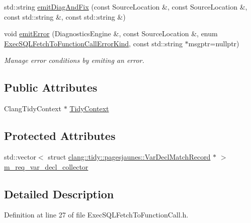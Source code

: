 \begin{DoxyCompactItemize}
std\+::string \hyperlink{classclang_1_1tidy_1_1pagesjaunes_1_1_exec_s_q_l_fetch_to_function_call_a4c78d8c38616b4f3cf6f4294f2a22953}{emit\+Diag\+And\+Fix} (const Source\+Location \&, const Source\+Location \&, const std\+::string \&, const std\+::string \&)
\item 
void \hyperlink{classclang_1_1tidy_1_1pagesjaunes_1_1_exec_s_q_l_fetch_to_function_call_a28043b514dd024dde394972563d78800}{emit\+Error} (Diagnostics\+Engine \&, const Source\+Location \&, enum \hyperlink{classclang_1_1tidy_1_1pagesjaunes_1_1_exec_s_q_l_fetch_to_function_call_aa05c362f1878d66a9239f3e154288081}{Exec\+S\+Q\+L\+Fetch\+To\+Function\+Call\+Error\+Kind}, const std\+::string $\ast$msgptr=nullptr)
\begin{DoxyCompactList}\small\item\em Manage error conditions by emiting an error. \end{DoxyCompactList}\end{DoxyCompactItemize}
\subsection*{Public Attributes}
\begin{DoxyCompactItemize}
\item 
Clang\+Tidy\+Context $\ast$ \hyperlink{classclang_1_1tidy_1_1pagesjaunes_1_1_exec_s_q_l_fetch_to_function_call_adaa3d15f432824085c1091d31c11fdf4}{Tidy\+Context}
\end{DoxyCompactItemize}
\subsection*{Protected Attributes}
\begin{DoxyCompactItemize}
\item 
std\+::vector$<$ struct \hyperlink{structclang_1_1tidy_1_1pagesjaunes_1_1_var_decl_match_record}{clang\+::tidy\+::pagesjaunes\+::\+Var\+Decl\+Match\+Record} $\ast$ $>$ \hyperlink{classclang_1_1tidy_1_1pagesjaunes_1_1_exec_s_q_l_fetch_to_function_call_abe52e863518a69f5d364a9daf9c0099d}{m\+\_\+req\+\_\+var\+\_\+decl\+\_\+collector}
\end{DoxyCompactItemize}


\subsection{Detailed Description}


Definition at line 27 of file Exec\+S\+Q\+L\+Fetch\+To\+Function\+Call.\+h.



